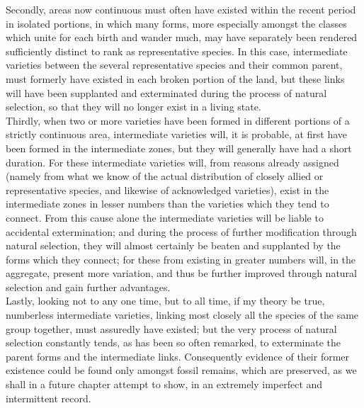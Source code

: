 \indent Secondly, areas now continuous must often have existed within the recent period in isolated portions, in which many forms, more especially amongst the classes which unite for each birth and wander much, may have separately been rendered sufficiently distinct to rank as representative species. In this case, intermediate varieties between the several representative species and their common parent, must formerly have existed in each broken portion of the land, but these links will have been supplanted and exterminated during the process of natural selection, so that they will no longer exist in a living state.\\
\indent Thirdly, when two or more varieties have been formed in different portions of a strictly continuous area, intermediate varieties will, it is probable, at first have been formed in the intermediate zones, but they will generally have had a short duration. For these intermediate varieties will, from reasons already assigned (namely from what we know of the actual distribution of closely allied or representative species, and likewise of acknowledged varieties), exist in the intermediate zones in lesser numbers than the varieties which they tend to connect. From this cause alone the intermediate varieties will be liable to accidental extermination; and during the process of further modification through natural selection, they will almost certainly be beaten and supplanted by the forms which they connect; for these from existing in greater numbers will, in the aggregate, present more variation, and thus be further improved through natural selection and gain further advantages.\\
\indent Lastly, looking not to any one time, but to all time, if my theory be true, numberless intermediate varieties, linking most closely all the species of the same group together, must assuredly have existed; but the very process of natural selection constantly tends, as has been so often remarked, to exterminate the parent forms and the intermediate links. Consequently evidence of their former existence could be found only amongst fossil remains, which are preserved, as we shall in a future chapter attempt to show, in an extremely imperfect and intermittent record.\\
